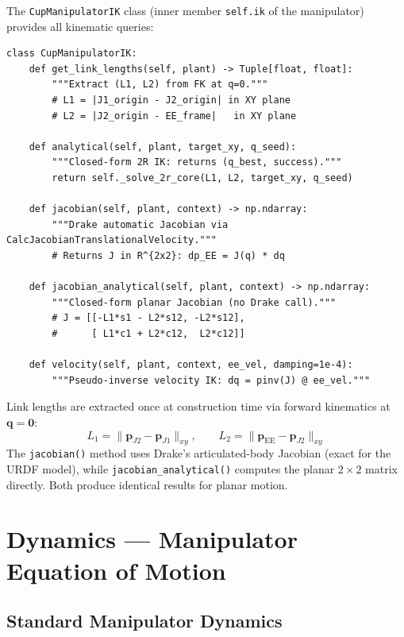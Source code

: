 \documentclass[11pt,a4paper]{article}
\newcommand{\bq}{\bm{q}}
\begin{document}
The \texttt{CupManipulatorIK} class (inner member \texttt{self.ik} of the manipulator) provides all kinematic queries:

\begin{lstlisting}[caption={IK helper methods.}]
class CupManipulatorIK:
    def get_link_lengths(self, plant) -> Tuple[float, float]:
        """Extract (L1, L2) from FK at q=0."""
        # L1 = |J1_origin - J2_origin| in XY plane
        # L2 = |J2_origin - EE_frame|   in XY plane

    def analytical(self, plant, target_xy, q_seed):
        """Closed-form 2R IK: returns (q_best, success)."""
        return self._solve_2r_core(L1, L2, target_xy, q_seed)

    def jacobian(self, plant, context) -> np.ndarray:
        """Drake automatic Jacobian via CalcJacobianTranslationalVelocity."""
        # Returns J in R^{2x2}: dp_EE = J(q) * dq

    def jacobian_analytical(self, plant, context) -> np.ndarray:
        """Closed-form planar Jacobian (no Drake call)."""
        # J = [[-L1*s1 - L2*s12, -L2*s12],
        #      [ L1*c1 + L2*c12,  L2*c12]]

    def velocity(self, plant, context, ee_vel, damping=1e-4):
        """Pseudo-inverse velocity IK: dq = pinv(J) @ ee_vel."""
\end{lstlisting}

\begin{codemath}
Link lengths are extracted once at construction time via forward kinematics at $\bq = \bm{0}$:
\[
    L_1 = \|\bm{p}_{J2} - \bm{p}_{J1}\|_{xy}, \qquad
    L_2 = \|\bm{p}_{\mathrm{EE}} - \bm{p}_{J2}\|_{xy}
\]
The \texttt{jacobian()} method uses Drake's articulated-body Jacobian (exact for the URDF model), while \texttt{jacobian\_analytical()} computes the planar $2\times 2$ matrix directly.  Both produce identical results for planar motion.
\end{codemath}


\section{Dynamics --- Manipulator Equation of Motion}
\label{sec:dynamics}

\subsection{Standard Manipulator Dynamics}
\end{document}

